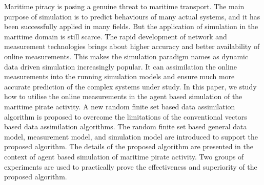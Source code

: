 Maritime piracy is posing a genuine threat to maritime transport.
The main purpose of simulation is to predict behaviours of many actual systems,
and it has been successfully applied in many fields.
But the application of simulation in the maritime domain is still scarce.
The rapid development of network and measurement technologies brings about
higher accuracy and better availability of online measurements.
This makes the simulation paradigm names as dynamic data driven simulation
increasingly popular.
It can assimilation the online measurements into the running simulation models
and ensure much more accurate prediction of the complex systems under study.
In this paper, we study how to utilise the online measurements in the agent
based simulation of the maritime pirate activity.
A new random finite set based data assimilation algorithm is proposed to
overcome the limitations of the conventional vectors based data assimilation
algorithms.
The random finite set based general data model, measurement model, and
simulation model are introduced to support the proposed algorithm.
The details of the proposed algorithm are presented in the context of agent
based simulation of maritime pirate activity.
Two groups of experiments are used to practically prove the effectiveness and
superiority of the proposed algorithm.



